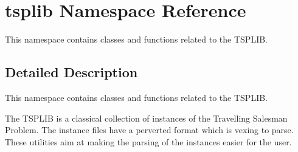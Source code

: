 \hypertarget{namespacetsplib}{}\section{tsplib Namespace Reference}
\label{namespacetsplib}


This namespace contains classes and functions related to the T\+S\+P\+L\+IB.  




\subsection{Detailed Description}
This namespace contains classes and functions related to the T\+S\+P\+L\+IB. 

The T\+S\+P\+L\+IB is a classical collection of instances of the Travelling Salesman Problem. The instance files have a perverted format which is vexing to parse. These utilities aim at making the parsing of the instances easier for the user. 